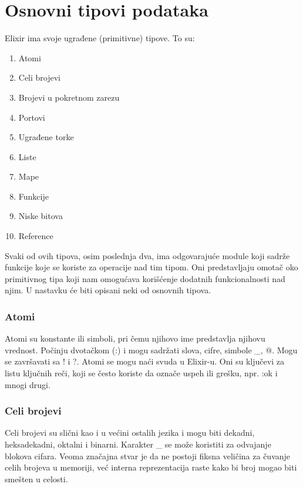 \documentclass[12pt,oneside]{memoir}
\begin{document}
\section{Osnovni tipovi podataka}

Elixir ima svoje ugrađene (primitivne) tipove. To su: 
\begin{enumerate}
    \item {Atomi}
    \item {Celi brojevi}
    \item {Brojevi u pokretnom zarezu}
    \item {Portovi}
    \item {Ugrađene torke}
    \item {Liste}
    \item {Mape}
    \item {Funkcije}
    \item {Niske bitova}
    \item {Reference}
\end{enumerate}

Svaki od ovih tipova, osim poslednja dva, ima odgovarajuće module koji sadrže funkcije koje se koriste za operacije nad tim tipom. Oni predstavljaju omotač oko primitivnog tipa koji nam omogućava korišćenje dodatnih funkcionalnosti nad njim. U nastavku će biti opisani neki od osnovnih tipova.\\

\subsubsection{Atomi}
Atomi su konstante ili simboli, pri čemu njihovo ime predstavlja njihovu vrednost. Počinju dvotačkom (:) i mogu sadržati slova, cifre, simbole \_, @. Mogu se završavati sa ! i ?. Atomi se mogu naći svuda u Elixir-u. Oni su ključevi za listu ključnih reči, koji se često koriste da označe uspeh ili grešku, npr. :ok i mnogi drugi.\\

\subsubsection{Celi brojevi}
Celi brojevi su slični kao i u većini ostalih jezika i mogu biti dekadni, heksadekadni, oktalni i binarni. Karakter \_ se može koristiti za odvajanje blokova cifara. Veoma značajna stvar je da ne postoji fiksna veličina za čuvanje celih brojeva u memoriji, već interna reprezentacija raste kako bi broj mogao biti smešten u celosti.\\
\end{document}
